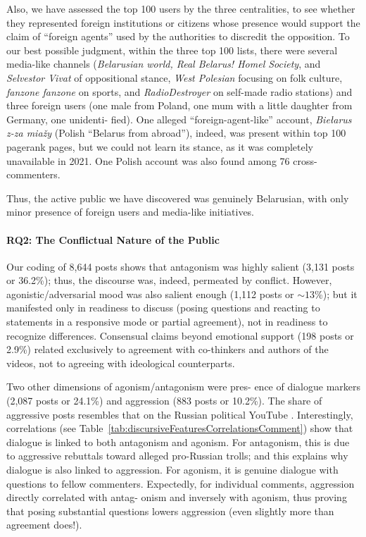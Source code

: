 Also, we have assessed the top 100 users by the three centralities, to see whether they represented foreign institutions or citizens whose presence would support the claim of “foreign agents” used by the authorities to discredit the opposition. To our best possible judgment, within the three top 100 lists, there were several media-like channels (\textit{Belarusian world, Real Belarus! Homel Society}, and \textit{Selvestor Vivat} of oppositional stance, \textit{West Polesian} focusing on folk culture, \textit{fanzone fanzone} on sports, and \textit{RadioDestroyer} on self-made radio stations) and three foreign users (one male from Poland, one mum with a little daughter from Germany, one unidenti- fied). One alleged “foreign-agent-like” account, \textit{Biełarus z-za miažy} (Polish “Belarus from abroad”), indeed, was present within top 100 pagerank pages, but we could not learn its stance, as it was completely unavailable in 2021. One Polish account was also found among 76 cross-commenters.

Thus, the active public we have discovered was genuinely Belarusian, with only minor presence of foreign users and media-like initiatives.

\paragraph{RQ2: The Conflictual Nature of the Public}
Our coding of 8,644 posts shows that antagonism was highly salient (3,131 posts or 36.2\%); thus, the discourse was, indeed, permeated by conflict. However, agonistic/adversarial mood was also salient enough (1,112 posts or \(\sim13\)\%); but it manifested only in readiness to discuss (posing questions and reacting to statements in a responsive mode or partial agreement), not in readiness to recognize differences. Consensual claims beyond emotional support (198 posts or 2.9\%) related exclusively to agreement with co-thinkers and authors of the videos, not to agreeing with ideological counterparts.

Two other dimensions of agonism/antagonism were pres- ence of dialogue markers (2,087 posts or 24.1\%) and aggression (883 posts or 10.2\%). The share of aggressive posts resembles that on the Russian political YouTube \cite{BodrunovaLitvinenkoBlekanov2021}. Interestingly, correlations (see Table~\cref{tab:discursiveFeaturesCorrelationsComment}) show that dialogue is linked to both antagonism and agonism. For antagonism, this is due to aggressive rebuttals toward alleged pro-Russian trolls; and this explains why dialogue is also linked to aggression. For agonism, it is genuine dialogue with questions to fellow commenters. Expectedly, for individual comments, aggression directly correlated with antag- onism and inversely with agonism, thus proving that posing substantial questions lowers aggression (even slightly more than agreement does!).

